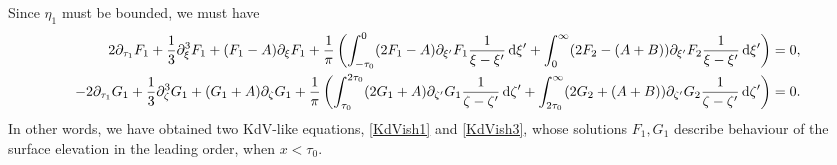 \documentclass[10pt,reqno,oneside,a4paper, landscape]{article}
\begin{document}
Since $\eta_1$ must be bounded, we must have 
\begin{align}
2 \partial_{\tau_1}F_1 + \frac{1}{3} \partial_\xi^3 F_1 + (F_1-A)\partial_\xi F_1 + \frac{1}{\pi} \left(\int^0_{-\tau_0} (2 F_1  - A)\partial_{\xi'} F_1\frac{1}{\xi -\xi'} \,\mathrm{d} \xi' + \int^{\infty}_{0} (2 F_2 - (A+B))\partial_{\xi'} F_2 \frac{1}{\xi -\xi'} \,\mathrm{d} \xi'\right) &= 0 \label{KdVish1}, \\
- 2 \partial_{\tau_1} G_1 +  \frac{1}{3} \partial_\zeta^3 G_1+ (G_1+A) \partial_{\zeta} G_1  +  \frac{1}{\pi} \left( \int^{2\tau_0}_{\tau_0} (2 G_1 + A) \partial_{\zeta'} G_1 \frac{1}{\zeta -\zeta'} \,\mathrm{d} \zeta' + \int^{\infty}_{2\tau_0} (2 G_2+(A+B)) \partial_{\zeta'} G_2 \frac{1}{\zeta -\zeta'} \,\mathrm{d} \zeta' \right) &= 0. \label{KdVish3}
\end{align}
In other words, we have obtained two KdV-like equations, \eqref{KdVish1} and \eqref{KdVish3}, whose solutions $F_1, G_1$ describe behaviour of the surface elevation in the leading order, when $x<\tau_0.$
 
\end{document}
